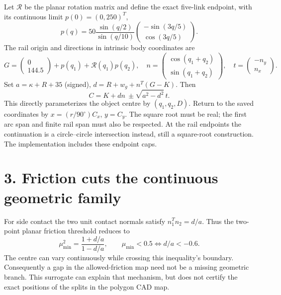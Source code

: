 \documentclass[11pt]{article}
\begin{document}
Let $\mathcal R$ be the planar rotation matrix and define the exact five-link
endpoint, with its continuous limit $p(0)=(0,250)^T$,
\[
 p(q)=50\frac{\sin(q/2)}{\sin(q/10)}
 \begin{pmatrix}-\sin(3q/5)\\\cos(3q/5)\end{pmatrix}.
\]
The rail origin and directions in intrinsic body coordinates are
\[
 G=\begin{pmatrix}0\\144.5\end{pmatrix}+p(q_1)+\mathcal R(q_1)p(q_2),
 \quad n=\begin{pmatrix}\cos(q_1+q_2)\\\sin(q_1+q_2)\end{pmatrix},
 \quad t=\begin{pmatrix}-n_y\\n_x\end{pmatrix}.
\]
Set $a=\kappa+R+35$ (signed), $d=R+w_g+n^T(G-K)$. Then
\[
 \boxed{C=K+dn\ \pm\sqrt{a^2-d^2}\,t.}
\]
This directly parameterizes the object centre by $(q_1,q_2,D)$.
Return to the saved coordinates by $x=(r/90^\circ)C_x$, $y=C_y$.
The square root must be real; the first arc span and finite rail span must
also be respected. At the rail endpoints the continuation is a circle--circle
intersection instead, still a square-root construction. The implementation
includes these endpoint caps.

\section*{3. Friction cuts the continuous geometric family}
For side contact the two unit contact normals satisfy $n_1^Tn_2=d/a$.
Thus the two-point planar friction threshold reduces to
\[
 \boxed{\mu_{\min}^2=\frac{1+d/a}{1-d/a},\qquad
 \mu_{\min}<0.5\iff d/a<-0.6.}
\]
The centre can vary continuously while crossing this inequality's boundary.
Consequently a gap in the allowed-friction map need not be a missing geometric
branch. This surrogate can explain that mechanism, but does not certify the
exact positions of the splits in the polygon CAD map.
\end{document}
